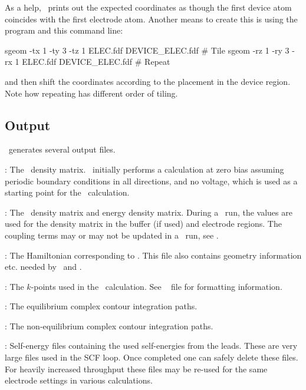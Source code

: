 As a help, \tsiesta\ prints out the expected coordinates as though the
first device atom coincides with the first electrode atom. Another
means to create this is using the \sisl\cite{sisl} program and this command
line:
\begin{fdfexample}
  sgeom -tx 1 -ty 3 -tz 1 ELEC.fdf DEVICE_ELEC.fdf # Tile
  sgeom -rz 1 -ry 3 -rx 1 ELEC.fdf DEVICE_ELEC.fdf # Repeat
\end{fdfexample}
and then shift the coordinates according to the placement in the
device region. Note how repeating has different order of tiling.

\subsection{Output}

\tsiesta\ generates several output files.  
\begin{description}
  \itemsep 10pt
  \parsep 0pt
  
  \item[\sysfile{DM}]: The \siesta\ density matrix. \siesta\ initially
  performs a calculation at zero bias assuming periodic boundary conditions in all
  directions, and no voltage, which is used as a starting point for the \tsiesta\
  calculation.
  
  \item[\sysfile{TSDE}]: The \tsiesta\ density matrix and energy
  density matrix. During a \tsiesta\ run, the \sysfile{DM} values are
  used for the density matrix in the buffer (if used) and electrode
  regions. The coupling terms may or may not be updated in a \tsiesta\
  run, see .
  
  \item[\sysfile{TSHS}]: The Hamiltonian corresponding to
  . This file also contains geometry information
  etc. needed by \tsiesta\ and \tbtrans.

  \item[\sysfile{TS.KP}]: The $k$-points used in the \tsiesta\ calculation. See
  \siesta\  file for formatting information.

  \item[\sysfile{TSCCEQ*}]: The equilibrium complex contour integration paths.

  \item[\sysfile{TSCCNEQ*}]: The non-equilibrium complex contour
  integration paths.

  \item[\sysfile{TSGF*}]: Self-energy files containing the used
  self-energies from the leads. These are very large files used in the
  SCF loop. Once completed one can safely delete these files.
  For heavily increased throughput these files may be re-used for the
  same electrode settings in various calculations.

\end{description} 

